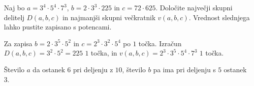 \documentclass[addpoints]{exam}
\begin{document}
\begin{questions}


    \question[4]
    Naj bo $a=3^4\cdot 5^4\cdot 7^3$, $b=2\cdot 3^3\cdot 225$ in $c=72\cdot 625$. 
    Določite največji skupni delitelj $D(a,b,c)$ in najmanjši skupni večkratnik $v(a,b,c)$. Vrednost slednjega lahko pustite zapisano s potencami.

    \begin{solution}[6cm]
        Za zapisa $b=2\cdot 3^5\cdot 5^2$ in $c=2^3\cdot 3^2\cdot 5^4$ po $1$ točka. 
        Izračun $D(a,b,c)=3^2\cdot 5^2=225$ $1$ točka, in $v(a,b,c)=2^3\cdot 3^5\cdot 5^4\cdot 7^3$ $1$ točka.
    \end{solution}
    
    
    \question
    Število $a$ da ostanek $6$ pri deljenju z $10$, število $b$ pa ima pri deljenju s $5$ ostanek $3$.




     \newpage

    



\end{questions}
\end{document}
